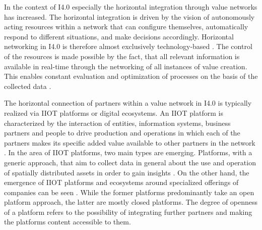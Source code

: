 In the context of \ac{I4.0} especially the horizontal integration through value networks has increased. The horizontal integration is driven by the vision of autonomously acting resources within a network that can configure themselves, automatically respond to different situations, and make decisions accordingly. Horizontal networking in \ac{I4.0} is therefore almost exclusively technology-based \cite[p. 20, 21]{Acatech2013Recommendations4.0}. The control of the resources is made possible by the fact, that all relevant information is available in real-time through the networking of all instances of value creation. This enables constant evaluation and optimization of processes on the basis of the collected data \cite[p. 24]{Acatech2013Recommendations4.0}. 

The horizontal connection of partners within a value network in \ac{I4.0} is typically realized via \ac{IIOT} platforms or digital ecosystems. An \ac{IIOT} platform is characterized by the interaction of entities, information systems, business partners and people to drive production and operations in which each of the partners makes its specific added value available to other partners in the network \cite[p. 5]{Falk2020ValueChina}. In the area of \ac{IIOT} platforms, two main types are emerging. Platforms, with a generic approach, that aim to collect data in general about the use and operation of spatially distributed assets in order to gain insights \cite[p. 11]{Falk2021DigitaleEntwicklung}. On the other hand, the emergence of \ac{IIOT} platforms and ecosystems around specialized offerings of companies can be seen \cite[p. 13]{Falk2021DigitaleEntwicklung}. While the former platforms predominantly take an open platform approach, the latter are mostly closed platforms. The degree of openness of a platform refers to the possibility of integrating further partners and making the platforms content accessible to them. 

